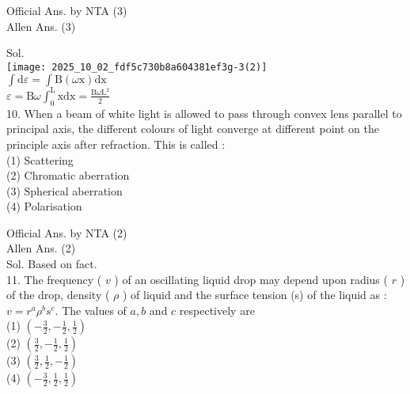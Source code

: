 \documentclass[10pt]{article}
\begin{document}
Official Ans. by NTA (3)\\
Allen Ans. (3)

Sol.\\
\texttt{[image: 2025\_10\_02\_fdf5c730b8a604381ef3g-3(2)]}\\
\(\int \mathrm{d} \varepsilon=\int \mathrm{B}(\omega \mathrm{x}) \mathrm{dx}\)\\
\(\varepsilon=\mathrm{B} \omega \int_{0}^{\mathrm{L}} \mathrm{xdx}=\frac{\mathrm{B} \omega \mathrm{L}^{2}}{2}\)\\
10. When a beam of white light is allowed to pass through convex lens parallel to principal axis, the different colours of light converge at different point on the principle axis after refraction. This is called :\\
(1) Scattering\\
(2) Chromatic aberration\\
(3) Spherical aberration\\
(4) Polarisation

Official Ans. by NTA (2)\\
Allen Ans. (2)\\
Sol. Based on fact.\\
11. The frequency ( \(v\) ) of an oscillating liquid drop may depend upon radius ( \(r\) ) of the drop, density ( \(\rho\) ) of liquid and the surface tension (s) of the liquid as :\\
\(v=r^{a} \rho^{b} s^{c}\). The values of \(a, b\) and \(c\) respectively are\\
(1) \(\left(-\frac{3}{2},-\frac{1}{2}, \frac{1}{2}\right)\)\\
(2) \(\left(\frac{3}{2},-\frac{1}{2}, \frac{1}{2}\right)\)\\
(3) \(\left(\frac{3}{2}, \frac{1}{2},-\frac{1}{2}\right)\)\\
(4) \(\left(-\frac{3}{2}, \frac{1}{2}, \frac{1}{2}\right)\)
\end{document}
